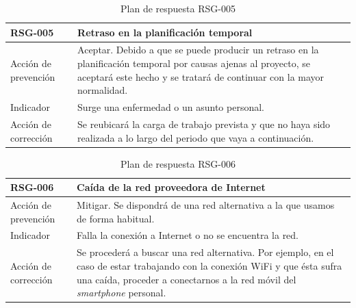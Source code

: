 \begin{table}[htpb]
\centering
\caption{Plan de respuesta RSG-005}
\begin{tabularx}{\textwidth}{|l|X|}
\hline
RSG-005              & Retraso en la planificación temporal                                                                                                                                                     \\ \hline
Acción de prevención & Aceptar. Debido a que se puede producir un retraso en la planificación temporal por causas ajenas al proyecto, se aceptará este hecho y se tratará de continuar con la mayor normalidad. \\ \hline
Indicador            & Surge una enfermedad o un asunto personal.                                                                                                                                               \\ \hline
Acción de corrección & Se reubicará la carga de trabajo prevista y que no haya sido realizada a lo largo del periodo que vaya a continuación.                                                                   \\ \hline
\end{tabularx}
\end{table}


\begin{table}[htpb]
\centering
\caption{Plan de respuesta RSG-006}
\begin{tabularx}{\textwidth}{|l|X|}
\hline
RSG-006              & Caída de la red proveedora de Internet                                                                                                                                                                 \\ \hline
Acción de prevención & Mitigar. Se dispondrá de una red alternativa a la que usamos de forma habitual.                                                                                                                        \\ \hline
Indicador            & Falla la conexión a Internet o no se encuentra la red.                                                                                                                                                 \\ \hline
Acción de corrección & Se procederá a buscar una red alternativa. Por ejemplo, en el caso de estar trabajando con la conexión WiFi y que ésta sufra una caída, proceder a conectarnos a la red móvil del \textit{smartphone} personal. \\ \hline
\end{tabularx}
\end{table}


